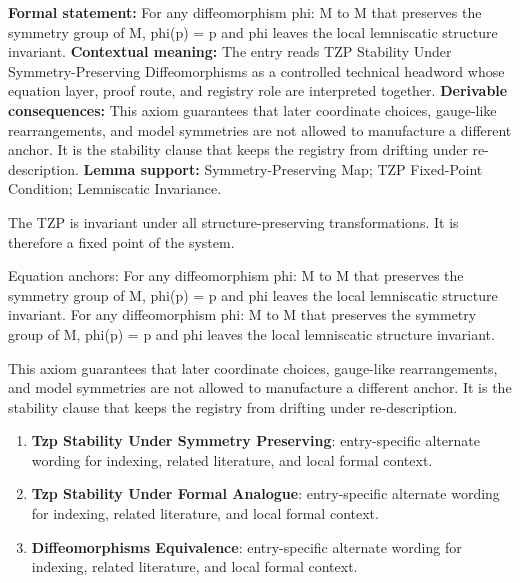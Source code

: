 \begingroup\footnotesize\setlength{\emergencystretch}{3em}\sloppy
\textbf{Formal statement:} For any diffeomorphism phi: M to M that preserves the symmetry group of M, phi(p) = p and phi leaves the local lemniscatic structure invariant. \textbf{Contextual meaning:} The entry reads TZP Stability Under Symmetry-Preserving Diffeomorphisms as a controlled technical headword whose equation layer, proof route, and registry role are interpreted together. \textbf{Derivable consequences:} This axiom guarantees that later coordinate choices, gauge-like rearrangements, and model symmetries are not allowed to manufacture a different anchor. It is the stability clause that keeps the registry from drifting under re-description. \textbf{Lemma support:} Symmetry-Preserving Map; TZP Fixed-Point Condition; Lemniscatic Invariance.\par
\endgroup

The TZP is invariant under all structure-preserving transformations. It is therefore a fixed point of the system.

Equation anchors: For any diffeomorphism phi: M to M that preserves the symmetry group of M, phi(p) = p and phi leaves the local lemniscatic structure invariant. For any diffeomorphism phi: M to M that preserves the symmetry group of M, phi(p) = p and phi leaves the local lemniscatic structure invariant.

This axiom guarantees that later coordinate choices, gauge-like rearrangements, and model symmetries are not allowed to manufacture a different anchor. It is the stability clause that keeps the registry from drifting under re-description.
\endgroup

\begingroup\footnotesize\sloppy
\begin{enumerate}[leftmargin=1.35em,itemsep=1pt,topsep=1pt,parsep=0pt]
\item \textbf{Tzp Stability Under Symmetry Preserving}: entry-specific alternate wording for indexing, related literature, and local formal context.
\item \textbf{Tzp Stability Under Formal Analogue}: entry-specific alternate wording for indexing, related literature, and local formal context.
\item \textbf{Diffeomorphisms Equivalence}: entry-specific alternate wording for indexing, related literature, and local formal context.
\end{enumerate}
\endgroup

